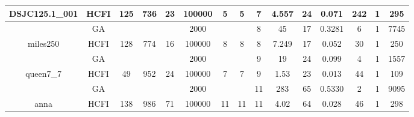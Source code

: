 \documentclass[10pt]{article}
\begin{document}
\begin{center}
\begin{table}[H]
\begin{tabular}{|c|c|c|c|c|c|c|c|c|c|c|c|c|c|c|}
 \multirow{-2}{*}{DSJC125.1\_001} &HCFI   &\multirow{-2}{*}{125}   &\multirow{-2}{*}{736}     &\multirow{-2}{*}{23}     &100000     &\multirow{-2}{*}{\cellcolor{yellow}5}      & \multirow{-2}{*}{\cellcolor{yellow}5}    &{\cellcolor{green}7}     &4.557         &24    &0.071         &242    &1     &295        \\ \hline \hline
	&GA&       &                   &                     & 2000        &     \cellcolor{yellow} & {\cellcolor{yellow}}& {{\cellcolor{green}8}}
&45   &17        &0.3281                   & 6                   &1          &7745        \\ \cline{2-2} \cline{6-6} \cline{9-15}
 \multirow{-2}{*}{miles250} &HCFI   &\multirow{-2}{*}{128}   &\multirow{-2}{*}{774}     &\multirow{-2}{*}{16}     &100000      &\multirow{-2}{*}{\cellcolor{yellow}8}      & \multirow{-2}{*}{\cellcolor{yellow}8}    &{\cellcolor{green}8}     &7.249         &17    &0.052         &30    &1     &       250 \\ \hline \hline
	&GA&       &                   &                     & 2000        &     \cellcolor{yellow} & {\cellcolor{yellow}}& {{\cellcolor{green}9}}
&19   & 24       &0.099                   & 4                   & 1         &1557        \\ \cline{2-2} \cline{6-6} \cline{9-15}
 \multirow{-2}{*}{queen7\_7} &HCFI   &\multirow{-2}{*}{49}   &\multirow{-2}{*}{952}     &\multirow{-2}{*}{24}     &100000     &\multirow{-2}{*}{\cellcolor{yellow}7}      & \multirow{-2}{*}{\cellcolor{yellow}7}    &{\cellcolor{green}9}     &1.53         &23    &0.013         &44    &1     &      109  \\ \hline \hline
	&GA&       &                   &                     & 2000        &     \cellcolor{yellow} & {\cellcolor{yellow}}& {{\cellcolor{green}11}}
&283   &65        & 0.5330                  &2                    &1          &9095        \\ \cline{2-2} \cline{6-6} \cline{9-15}
 \multirow{-2}{*}{anna} &HCFI   &\multirow{-2}{*}{138}   &\multirow{-2}{*}{986}     &\multirow{-2}{*}{71}     &100000     &\multirow{-2}{*}{\cellcolor{yellow}11}      & \multirow{-2}{*}{\cellcolor{yellow}11}    &{\cellcolor{green}11}     &4.02         &64    &0.028         &46    &1     &298        \\ \hline \hline

\end{tabular}
\end{table}
\end{center}
\end{document}
